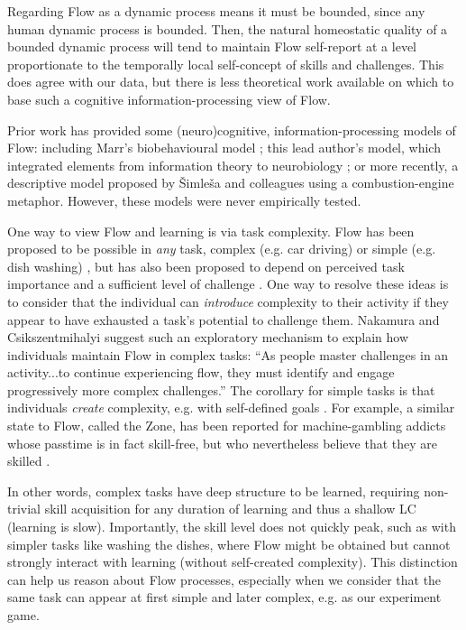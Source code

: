 \documentclass[fleqn,10pt]{wlscirep}
\begin{document}
Regarding Flow as a dynamic process means it must be bounded, since any human dynamic process is bounded. Then, the natural homeostatic quality of a bounded dynamic process will tend to maintain Flow self-report at a level proportionate to the temporally local self-concept of skills and challenges. This does agree with our data, but there is less theoretical work available on which to base such a cognitive information-processing view of Flow.

Prior work has provided some (neuro)cognitive, information-processing models of Flow: including Marr's biobehavioural model \cite{Marr2001}; this lead author's model, which integrated elements from information theory to neurobiology \cite{Cowley2008}; or more recently, a descriptive model proposed by {\v{S}}imle{\v{s}}a and colleagues \cite{Simlesa2018} using a combustion-engine metaphor. However, these models were never empirically tested.

One way to view Flow and learning is via task complexity. Flow has been proposed to be possible in {\it any} task, complex (e.g. car driving) or simple (e.g. dish washing) \cite{Csikszentmihalyi1999}, but has also been proposed to depend on perceived task importance and a sufficient level of challenge \cite{Keller2012}. One way to resolve these ideas is to consider that the individual can {\it introduce} complexity to their activity if they appear to have exhausted a task's potential to challenge them. Nakamura and Csikszentmihalyi \cite{Nakamura2002} suggest such an exploratory mechanism to explain how individuals maintain Flow in complex tasks: ``As people master challenges in an activity...to continue experiencing flow, they must identify and engage progressively more complex challenges.'' The corollary for simple tasks is that individuals {\it create} complexity, e.g. with self-defined goals \cite{Rauterberg1995}. For example, a similar state to Flow, called the Zone, has been reported for machine-gambling addicts whose passtime is in fact skill-free, but who nevertheless believe that they are skilled \cite{Schull2014}.

In other words, complex tasks have deep structure to be learned, requiring non-trivial skill acquisition for any duration of learning and thus a shallow LC (learning is slow). Importantly, the skill level does not quickly peak, such as with simpler tasks like washing the dishes, where Flow might be obtained but cannot strongly interact with learning (without self-created complexity). This distinction can help us reason about Flow processes, especially when we consider that the same task can appear at first simple and later complex, e.g. as our experiment game.
\end{document}
